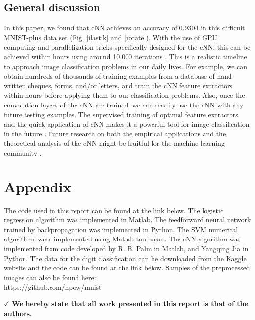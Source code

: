 \documentclass[conference]{IEEEtran}
\begin{document}
\subsection{General discussion}
In this paper, we found that cNN achieves an accuracy of 0.9304 in this difficult MNIST-plus data set (Fig. \ref{ilastik} and \ref{rotate}). With the use of GPU computing and parallelization tricks specifically designed for the cNN, this can be achieved within hours using around 10,000 iterations \cite{DBLP:journals/corr/Krizhevsky14,bottou-tricks-2012}. This is a realistic timeline to approach image classification problems in our daily lives. For example, we can obtain hundreds of thousands of training examples from a database of hand-written cheques, forms, and/or letters, and train the cNN feature extractors within hours before applying them to our classification problems. Also, once the convolution layers of the cNN are trained, we can readily use the cNN with any future testing examples. The supervised training of optimal feature extractors and the quick application of cNN makes it a powerful tool for image classification in the future \cite{DBLP:journals/corr/abs-1206-4656}. Future research on both the empirical applications and the theoretical analysis of the cNN might be fruitful for the machine learning community \cite{journals/cacm/Domingos12}.


\section*{Appendix}

The code used in this report can be found at the link below. The logistic regression algorithm was implemented in Matlab. The feedforward neural network trained by backpropagation was implemented in Python. The SVM numerical algorithms were implemented using Matlab toolboxes. The cNN algorithm was implemented from code developed by R. B. Palm \cite{IMM2012-06284} in Matlab, and Yangqing Jia \cite{jia2014caffe} in Python. The data for the digit classification can be downloaded from the Kaggle website and the code can be found at the link below. Samples of the preprocessed images can also be found here:\\
{\scriptsize https://github.com/npow/mnist}

$\checkmark$ \textbf{We hereby state that all work presented in this report is that of the authors.}

\printbibliography[heading=bibintoc,title={Reference}]

\end{document}
